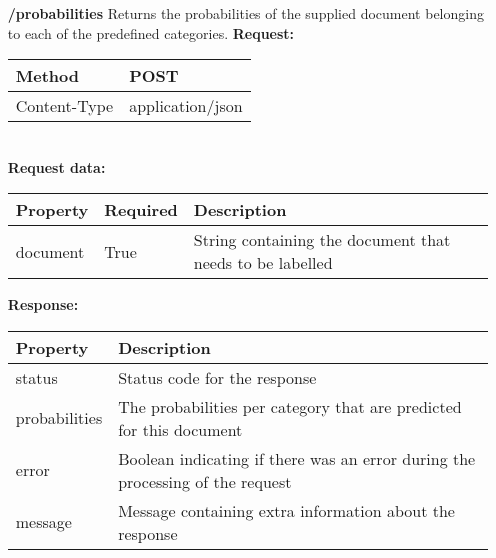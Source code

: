 \begin{enumerate}
\begin{tabular}{ | l | l |}
\end{tabular}
\item[\textbf{/probabilities}]
Returns the probabilities of the supplied document belonging to each of the predefined categories. 
\newline
\newline
\textbf{Request:}
\newline
\newline
\begin{tabular}{ | l | l |}
\hline
Method & POST\\ \hline
Content-Type & application/json\\ \hline
\end{tabular}
\\
\textbf{Request data:}\\
\begin{tabular}{ | l | l | l |}
\hline
\textbf{Property} & \textbf{Required} & \textbf{Description}\\ \hline
document & True & String containing the document that needs to be labelled\\ \hline
\end{tabular}
\newline
\newline
\textbf{Response:}
\newline
\newline
\begin{tabular}{ | l | l |}
\hline
\textbf{Property} & \textbf{Description}\\ \hline
status & Status code for the response\\ \hline
probabilities & The probabilities per category that are predicted for this document\\ \hline
error & Boolean indicating if there was an error during the processing of the request\\ \hline
message & Message containing extra information about the response\\ \hline
\end{tabular}
\end{enumerate}